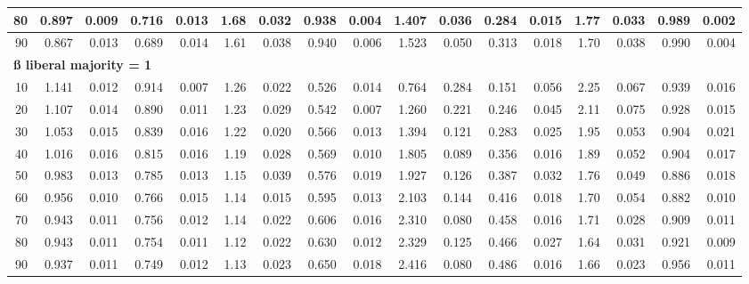 \documentclass[
]{article}
\begin{document}
\begin{table}[H]
\begin{table}
{\begin{tabular}{r|r|r|r|r|r|r|r|r|r|r|r|r|r|r|r|r}
\hline
\hspace{1em}80 & 0.897 & 0.009 & 0.716 & 0.013 & 1.68 & 0.032 & 0.938 & 0.004 & 1.407 & 0.036 & 0.284 & 0.015 & 1.77 & 0.033 & 0.989 & 0.002\\
\hline
\hspace{1em}90 & 0.867 & 0.013 & 0.689 & 0.014 & 1.61 & 0.038 & 0.940 & 0.006 & 1.523 & 0.050 & 0.313 & 0.018 & 1.70 & 0.038 & 0.990 & 0.004\\
\hline
\multicolumn{17}{l}{\textbf{ß liberal majority = 1}}\\
\hline
\hspace{1em}10 & 1.141 & 0.012 & 0.914 & 0.007 & 1.26 & 0.022 & 0.526 & 0.014 & 0.764 & 0.284 & 0.151 & 0.056 & 2.25 & 0.067 & 0.939 & 0.016\\
\hline
\hspace{1em}20 & 1.107 & 0.014 & 0.890 & 0.011 & 1.23 & 0.029 & 0.542 & 0.007 & 1.260 & 0.221 & 0.246 & 0.045 & 2.11 & 0.075 & 0.928 & 0.015\\
\hline
\hspace{1em}30 & 1.053 & 0.015 & 0.839 & 0.016 & 1.22 & 0.020 & 0.566 & 0.013 & 1.394 & 0.121 & 0.283 & 0.025 & 1.95 & 0.053 & 0.904 & 0.021\\
\hline
\hspace{1em}40 & 1.016 & 0.016 & 0.815 & 0.016 & 1.19 & 0.028 & 0.569 & 0.010 & 1.805 & 0.089 & 0.356 & 0.016 & 1.89 & 0.052 & 0.904 & 0.017\\
\hline
\hspace{1em}50 & 0.983 & 0.013 & 0.785 & 0.013 & 1.15 & 0.039 & 0.576 & 0.019 & 1.927 & 0.126 & 0.387 & 0.032 & 1.76 & 0.049 & 0.886 & 0.018\\
\hline
\hspace{1em}60 & 0.956 & 0.010 & 0.766 & 0.015 & 1.14 & 0.015 & 0.595 & 0.013 & 2.103 & 0.144 & 0.416 & 0.018 & 1.70 & 0.054 & 0.882 & 0.010\\
\hline
\hspace{1em}70 & 0.943 & 0.011 & 0.756 & 0.012 & 1.14 & 0.022 & 0.606 & 0.016 & 2.310 & 0.080 & 0.458 & 0.016 & 1.71 & 0.028 & 0.909 & 0.011\\
\hline
\hspace{1em}80 & 0.943 & 0.011 & 0.754 & 0.011 & 1.12 & 0.022 & 0.630 & 0.012 & 2.329 & 0.125 & 0.466 & 0.027 & 1.64 & 0.031 & 0.921 & 0.009\\
\hline
\hspace{1em}90 & 0.937 & 0.011 & 0.749 & 0.012 & 1.13 & 0.023 & 0.650 & 0.018 & 2.416 & 0.080 & 0.486 & 0.016 & 1.66 & 0.023 & 0.956 & 0.011\\

\end{tabular}}
\end{table}
\end{table}
\end{document}
